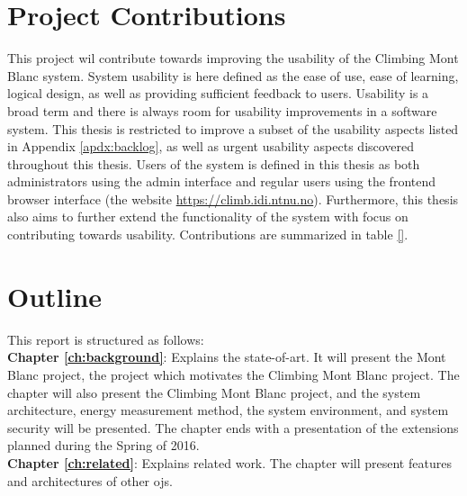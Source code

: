 \section{Project Contributions}
\label{sec:cont}
This project wil contribute towards improving the usability of the Climbing Mont Blanc system. System usability is here defined as the ease of use, ease of learning, logical design, as well as providing sufficient feedback to users. Usability is a broad term and there is always room for usability improvements in a software system. This thesis is restricted to improve a subset of the usability aspects listed in Appendix \ref{apdx:backlog}, as well as urgent usability aspects discovered throughout this thesis. Users of the system is defined in this thesis as both administrators using the admin interface and regular users using the frontend browser interface (the website \url{https://climb.idi.ntnu.no}). Furthermore, this thesis also aims to further extend the functionality of the system with focus on contributing towards usability. Contributions are summarized in table \ref{}.



\section{Outline}
\label{sec:out}
This report is structured as follows:\\

\noindent
\textbf{Chapter \ref{ch:background}}: Explains the state-of-art. It will present the Mont Blanc project, the project which motivates the Climbing Mont Blanc project. The chapter will also present the Climbing Mont Blanc project, and the system architecture, energy measurement method, the system environment, and system security will be presented. The chapter ends with a presentation of the extensions planned during the Spring of 2016. \\

\textbf{Chapter \ref{ch:related}}: Explains related work. The chapter will present features and architectures of other \gls{ojs}.
